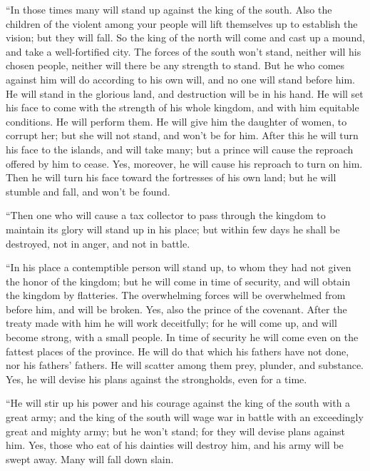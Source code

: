 {\par }{\PP {}“In those times many will stand up against the king of the south. Also the children of the violent among your people will lift themselves up to establish the vision; but they will fall.
So the king of the north will come and cast up a mound, and take a well-fortified city. The forces of the south won’t stand, neither will his chosen people, neither will there be any strength to stand.
But he who comes against him will do according to his own will, and no one will stand before him. He will stand in the glorious land, and destruction will be in his hand.
He will set his face to come with the strength of his whole kingdom, and with him equitable conditions. He will perform them. He will give him the daughter of women, to corrupt her; but she will not stand, and won’t be for him.
After this he will turn his face to the islands, and will take many; but a prince will cause the reproach offered by him to cease. Yes, moreover, he will cause his reproach to turn on him.
Then he will turn his face toward the fortresses of his own land; but he will stumble and fall, and won’t be found.
\par }{\PP {}“Then one who will cause a tax collector to pass through the kingdom to maintain its glory will stand up in his place; but within few days he shall be destroyed, not in anger, and not in battle.
\par }{\PP {}“In his place a contemptible person will stand up, to whom they had not given the honor of the kingdom; but he will come in time of security, and will obtain the kingdom by flatteries.
The overwhelming forces will be overwhelmed from before him, and will be broken. Yes, also the prince of the covenant.
After the treaty made with him he will work deceitfully; for he will come up, and will become strong, with a small people.
In time of security he will come even on the fattest places of the province. He will do that which his fathers have not done, nor his fathers’ fathers. He will scatter among them prey, plunder, and substance. Yes, he will devise his plans against the strongholds, even for a time.
\par }{\PP {}“He will stir up his power and his courage against the king of the south with a great army; and the king of the south will wage war in battle with an exceedingly great and mighty army; but he won’t stand; for they will devise plans against him.
Yes, those who eat of his dainties will destroy him, and his army will be swept away. Many will fall down slain.
}
